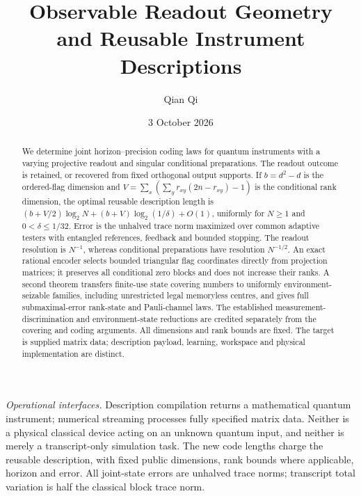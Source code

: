 \documentclass[11pt]{amsart}
\title[Observable readout geometry]{Observable Readout Geometry\\and Reusable Instrument Descriptions}
\author{Qian Qi}
\date{3 October 2026}
\numberwithin{equation}{section}
\theoremstyle{definition}\newtheorem{definition}[theorem]{Definition}
\theoremstyle{remark}\newtheorem{remark}[theorem]{Remark}
\begin{document}
\raggedbottom
\begin{abstract}
We determine joint horizon--precision coding laws for quantum
instruments with a varying projective readout and singular conditional
preparations. The readout outcome is retained, or recovered from fixed
orthogonal output supports. If $b=d^2-d$ is the ordered-flag dimension
and $V=\sum_x(\sum_y r_{xy}(2n-r_{xy})-1)$ is the conditional
rank dimension, the optimal reusable description length is
$(b+V/2)\log_2N+(b+V)\log_2(1/\delta)+O(1)$, uniformly for
$N\ge1$ and $0<\delta\le1/32$. Error is the unhalved trace norm
maximized over common adaptive testers with entangled references,
feedback and bounded stopping. The readout resolution is $N^{-1}$,
whereas conditional preparations have resolution $N^{-1/2}$.
An exact rational encoder selects bounded triangular flag coordinates
directly from projection matrices; it preserves all conditional zero
blocks and does not increase their ranks. A second theorem transfers
finite-use state covering numbers to uniformly environment-seizable
families, including unrestricted legal memoryless centres, and gives
full submaximal-error rank-state and Pauli-channel laws. The established
measurement-discrimination and environment-state reductions are credited
separately from the covering and coding arguments. All dimensions and
rank bounds are fixed. The target is supplied matrix data; description
payload, learning, workspace and physical implementation are distinct.
\end{abstract}
\maketitle
\noindent\textit{Operational interfaces.}
Description compilation returns a mathematical quantum instrument;
numerical streaming processes fully specified matrix data. Neither is a
physical classical device acting on an unknown quantum input, and
neither is merely a transcript-only simulation task. The new code lengths
charge the reusable description, with fixed public dimensions, rank bounds where applicable, horizon and error.
All joint-state errors
are unhalved trace norms; transcript total variation is half the classical
block trace norm.
















\end{document}
